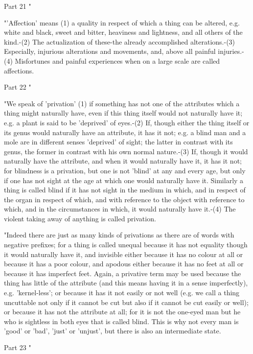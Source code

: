 Part 21 "

"'Affection' means (1) a quality in respect of which a thing can be
altered, e.g. white and black, sweet and bitter, heaviness and lightness,
and all others of the kind.-(2) The actualization of these-the already
accomplished alterations.-(3) Especially, injurious alterations and
movements, and, above all painful injuries.-(4) Misfortunes and painful
experiences when on a large scale are called affections.

Part 22 "

"We speak of 'privation' (1) if something has not one of the attributes
which a thing might naturally have, even if this thing itself would
not naturally have it; e.g. a plant is said to be 'deprived' of eyes.-(2)
If, though either the thing itself or its genus would naturally have
an attribute, it has it not; e.g. a blind man and a mole are in different
senses 'deprived' of sight; the latter in contrast with its genus,
the former in contrast with his own normal nature.-(3) If, though
it would naturally have the attribute, and when it would naturally
have it, it has it not; for blindness is a privation, but one is not
'blind' at any and every age, but only if one has not sight at the
age at which one would naturally have it. Similarly a thing is called
blind if it has not sight in the medium in which, and in respect of
the organ in respect of which, and with reference to the object with
reference to which, and in the circumstances in which, it would naturally
have it.-(4) The violent taking away of anything is called privation.

"Indeed there are just as many kinds of privations as there are of
words with negative prefixes; for a thing is called unequal because
it has not equality though it would naturally have it, and invisible
either because it has no colour at all or because it has a poor colour,
and apodous either because it has no feet at all or because it has
imperfect feet. Again, a privative term may be used because the thing
has little of the attribute (and this means having it in a sense imperfectly),
e.g. 'kernel-less'; or because it has it not easily or not well (e.g.
we call a thing uncuttable not only if it cannot be cut but also if
it cannot be cut easily or well); or because it has not the attribute
at all; for it is not the one-eyed man but he who is sightless in
both eyes that is called blind. This is why not every man is 'good'
or 'bad', 'just' or 'unjust', but there is also an intermediate state.

Part 23 "

